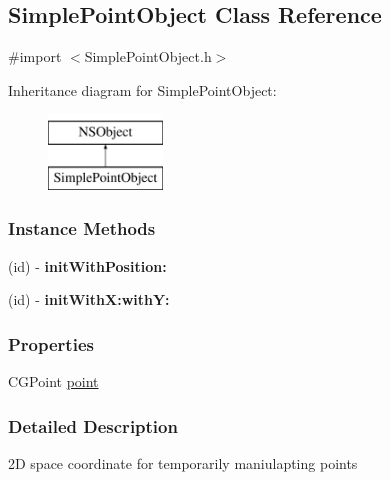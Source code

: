 \hypertarget{interface_simple_point_object}{\subsection{Simple\-Point\-Object Class Reference}
\label{d8/d8e/interface_simple_point_object}
}


{\ttfamily \#import $<$Simple\-Point\-Object.\-h$>$}

Inheritance diagram for Simple\-Point\-Object\-:\begin{figure}[H]
\begin{center}
\leavevmode
\includegraphics[height=2.000000cm]{d8/d8e/interface_simple_point_object}
\end{center}
\end{figure}
\subsubsection*{Instance Methods}
\begin{DoxyCompactItemize}
\item 
\hypertarget{interface_simple_point_object_aa5ee92b5c2b007401904a3faefefcd76}{(id) -\/ {\bfseries init\-With\-Position\-:}}\label{d8/d8e/interface_simple_point_object_aa5ee92b5c2b007401904a3faefefcd76}

\item 
\hypertarget{interface_simple_point_object_ac92f127e890c45727110d3d5dd23b2a6}{(id) -\/ {\bfseries init\-With\-X\-:with\-Y\-:}}\label{d8/d8e/interface_simple_point_object_ac92f127e890c45727110d3d5dd23b2a6}

\end{DoxyCompactItemize}
\subsubsection*{Properties}
\begin{DoxyCompactItemize}
\item 
C\-G\-Point \hyperlink{interface_simple_point_object_a9796a8e6a00e61bb255f59a80aef77d4}{point}
\end{DoxyCompactItemize}


\subsubsection{Detailed Description}
2\-D space coordinate for temporarily maniulapting points 

